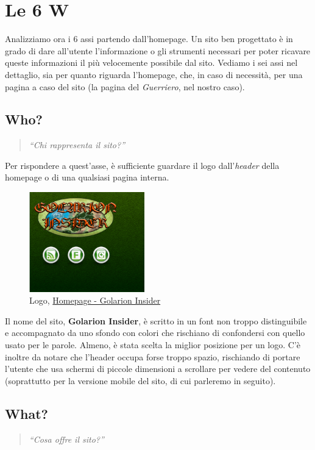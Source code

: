 \section{Le 6 W}

Analizziamo ora i 6 assi partendo dall'homepage. Un sito ben progettato è in grado di 
dare all'utente l'informazione o gli strumenti necessari per poter ricavare queste informazioni
il più velocemente possibile dal sito. Vediamo i sei assi nel dettaglio, sia per quanto riguarda
l'homepage, che, in caso di necessità, per una pagina a caso del sito (la pagina del 
\emph{Guerriero}, nel nostro caso). 

\subsection{Who?}
\begin{quote}
    \emph{``Chi rappresenta il sito?''}
\end{quote}
Per rispondere a quest'asse, è sufficiente guardare il logo dall'\emph{header} della homepage o di 
una qualsiasi pagina interna.
\begin{figure}[hbt]
    \centering
    \includegraphics[width=5cm]{img/logo.png}
    \caption{Logo, \href{http://golarion.altervista.org/wiki/Pagina_principale}{Homepage - Golarion Insider}}
\end{figure}

Il nome del sito, \textbf{Golarion Insider}, è scritto in un font non troppo distinguibile e accompagnato da uno sfondo 
con colori che rischiano di confondersi con quello usato per le parole. Almeno, è stata scelta la miglior posizione per un logo.
C'è inoltre da notare che l'header occupa forse troppo spazio, rischiando di portare l'utente che usa schermi di piccole dimensioni
a scrollare per vedere del contenuto
(soprattutto per la versione mobile del sito, di cui parleremo in seguito).

\subsection{What?}
\begin{quote}
    \emph{``Cosa offre il sito?''}
\end{quote}

